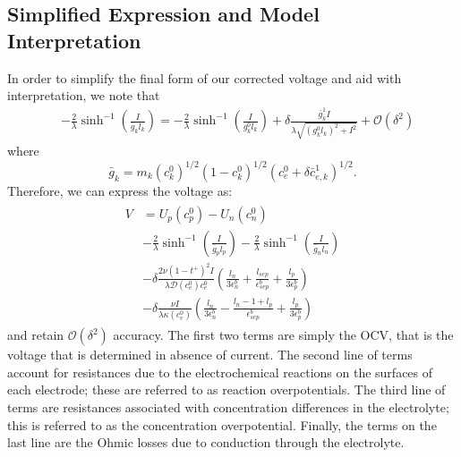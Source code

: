 \documentclass[preprint]{elsarticle}
\begin{document}
\subsection{Simplified Expression and Model Interpretation} 
In order to simplify the final form of our corrected voltage and aid with interpretation, we note that
\begin{align*} 
	&-\frac{2}{\lambda}\sinh^{-1}\left(\frac{I}{\bar{g}_k l_k}\right) = -\frac{2}{\lambda}\sinh^{-1}\left(\frac{I}{g_k^0l_k} \right)
    +\delta \frac{\bar{g}_k^1 I}{\lambda\sqrt{(g_k^0l_k)^2+I^2}} 
    + \mathcal{O}\left(\delta^2\right)
\end{align*} 
where 
\begin{equation} 
	\bar{g}_k = m_k  (c_k^0)^{1/2}(1-c_k^0)^{1/2}(c_e^0+\delta\bar{c}_{e,k}^1 )^{1/2}.
\end{equation} 
Therefore, we can express the voltage as: 
\begin{align}\label{eqn:simple}
\begin{split} 
V &= U_p(c_p^0) - U_n(c_n^0) \\
	 & - \frac{2}{\lambda}\sinh^{-1}\left( \frac{I}{\bar{g}_p l_p} \right) 
     - \frac{2}{\lambda} \sinh^{-1}\left( \frac{I}{\bar{g}_n l_n} \right) \\ 
     &-\delta\frac{2 \nu (1-t^+)^2I}{\lambda \mathcal{D}(c_e^0)c_e^0}\left( \frac{l_n}{3 \epsilon_n^b} + \frac{l_{sep}}{\epsilon_{sep}^b} + \frac{l_p}{3\epsilon_p^b} \right) \\ 
    & - \delta \frac{\nu I}{\lambda \kappa(c_e^0)} \left(\frac{l_n}{3\epsilon_n^b} - \frac{l_n - 1 + l_p}{\epsilon_{sep}^b} + \frac{l_p}{3\epsilon_p^b} \right)
\end{split}
\end{align} 
and retain $\mathcal{O}(\delta^2)$ accuracy. The first two terms are simply the OCV, that is the voltage that is determined in absence of current. The second line of terms account for resistances due to the electrochemical reactions on the surfaces of each electrode; these are referred to as reaction overpotentials. The third line of terms are resistances associated with concentration differences in the electrolyte; this is referred to as the concentration overpotential. Finally, the terms on the last line are the Ohmic losses due to conduction through the electrolyte. 
\end{document}
